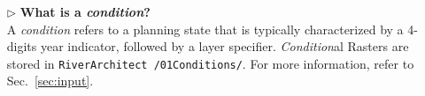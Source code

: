\begin{itemize}
	\item[$\triangleright$] \textbf{What is a \textit{condition}?}\\
	A \textit{condition} refers to a planning state that is typically characterized by a 4-digits year indicator, followed by a layer specifier. \textit{Condition}al Rasters are stored in \texttt{RiverArchitect /01{\myUnderscore}Conditions/}. For more information, refer to Sec.~\ref{sec:input}.

	

\end{itemize}
